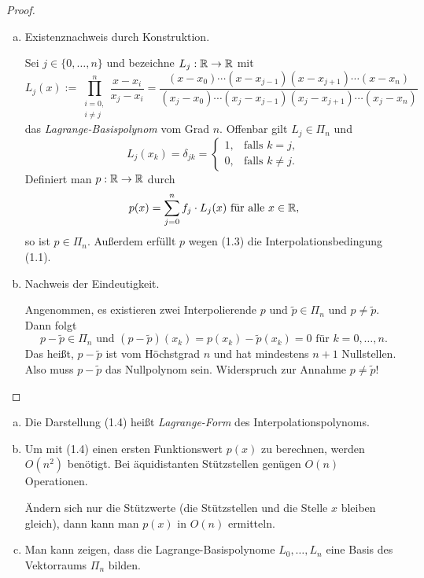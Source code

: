 \begin{proof}
 \begin{enumerate}[a)]
  \item Existenznachweis durch Konstruktion.
  
  Sei $j \in \{ 0, \ldots, n \}$ und bezeichne $L_j: \mathbb{R} \to \mathbb{R}$ mit
  \[ L_j(x) := \prod_{\substack{i=0,\\i \ne j}}^n \frac{x-x_i}{x_j-x_i} = \frac{(x-x_0)\cdots(x-x_{j-1})(x-x_{j+1})\cdots(x-x_n)}{(x_j-x_0)\cdots(x_j-x_{j-1})(x_j-x_{j+1})\cdots(x_j-x_n)} \]
  das \emph{Lagrange-Basispolynom} vom Grad $n$. Offenbar gilt $L_j \in \Pi_n$ und
  \begin{equation} L_j(x_k) = \delta_{jk} = \begin{cases}
                 1, &\text{falls } k = j, \\
                 0, &\text{falls } k \ne j.
                \end{cases} \end{equation}
  Definiert man $p: \mathbb{R} \to \mathbb{R}$ durch
  \begin{equation} p(x) = \sum_{j=0}^n f_j \cdot L_j(x) \text{ für alle } x \in \mathbb{R}, \end{equation}
  so ist $p \in \Pi_n$. Außerdem erfüllt $p$ wegen (1.3) die Interpolationsbedingung (1.1).
  \item Nachweis der Eindeutigkeit.
  
  Angenommen, es existieren zwei Interpolierende $p$ und $\tilde{p} \in \Pi_n$ und $p \ne \tilde{p}$. Dann folgt 
  \[ p - \tilde{p} \in \Pi_n \text{ und } (p-\tilde{p})(x_k) = p(x_k) - \tilde{p}(x_k) = 0 \text{ für } k = 0, \ldots, n. \]
  Das heißt, $p - \tilde{p}$ ist vom Höchstgrad $n$ und hat mindestens $n+1$ Nullstellen. Also muss $p-\tilde{p}$ das Nullpolynom sein. Widerspruch zur Annahme $p \ne \tilde{p}$!
 \end{enumerate}
\end{proof}

\begin{rmrk}
 \begin{enumerate}[a)]
  \item Die Darstellung (1.4) heißt \emph{Lagrange-Form} des Interpolationspolynoms.
  \item Um mit (1.4) einen ersten Funktionswert $p(x)$ zu berechnen, werden $O(n^2)$ benötigt. Bei äquidistanten Stützstellen genügen $O(n)$ Operationen.
  
  Ändern sich nur die Stützwerte (die Stützstellen und die Stelle $x$ bleiben gleich), dann kann man $p(x)$ in $O(n)$ ermitteln.
  \item Man kann zeigen, dass die Lagrange-Basispolynome $L_0, \ldots, L_n$ eine Basis des Vektorraums $\Pi_n$ bilden.
 \end{enumerate}
\end{rmrk}

